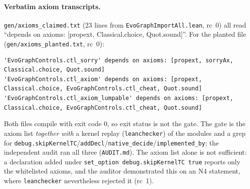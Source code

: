 \documentclass[11pt]{article}
\begin{document}




\paragraph{Verbatim axiom transcripts.} \texttt{gen/axioms\_claimed.txt} (23 lines from \texttt{EvoGraphImportAll.lean}, rc~0) all read ``depends on axioms: [propext, Classical.choice, Quot.sound]''. For the planted file (\texttt{gen/axioms\_planted.txt}, rc~0):
\begin{lstlisting}[basicstyle=\ttfamily\tiny]
'EvoGraphControls.ctl_sorry' depends on axioms: [propext, sorryAx, Classical.choice, Quot.sound]
'EvoGraphControls.ctl_axiom' depends on axioms: [propext, Classical.choice, EvoGraphControls.ctl_cheat, Quot.sound]
'EvoGraphControls.ctl_axiom_lumpable' depends on axioms: [propext, Classical.choice, EvoGraphControls.ctl_cheat, Quot.sound]
\end{lstlisting}
Both files compile with exit code $0$, so exit status is not the gate. The gate is the axiom list \emph{together with} a kernel replay (\texttt{leanchecker}) of the modules and a grep for \texttt{debug.skipKernelTC}/\texttt{addDecl}/\texttt{native\_decide}/\texttt{implemented\_by}; the independent audit ran all three (\texttt{AUDIT.md}). The axiom list alone is not sufficient: a declaration added under \texttt{set\_option debug.skipKernelTC true} reports only the whitelisted axioms, and the auditor demonstrated this on an N4 statement, where \texttt{leanchecker} nevertheless rejected it (rc~1).

\end{document}
